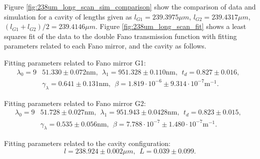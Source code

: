 Figure \ref{fig:238um_long_scan_sim_comparison} show the comparison of data and simulation for a cavity of lengths given as $l_{G1} = 239.3975 \mu m$, $l_{G2} = 239.4317 \mu m$, $(l_{G1} + l_{G2})/2 = 239.4146 \mu m$. Figure \ref{fig:238um_long_scan_fit} shows a least squares fit of the data to the double Fano transmission function with fitting parameters related to each Fano mirror, and the cavity as follows.

Fitting parameters related to Fano mirror G1:
\begin{equation}
    \begin{split}
        \lambda_0 = 9&51.330 \pm 0.072 \text{nm}, \:\: \lambda_1 = 951.328 \pm 0.110 \text{nm}, \:\: t_d = 0.827 \pm 0.016, \:\: \\&\gamma_{\lambda} = 0.641 \pm 0.131 \text{nm}, \:\: \beta = 1.819 \cdot 10^{-6} \pm 9.314 \cdot 10^{-7} \text{m}^{-1}.
    \end{split}
\end{equation}

Fitting parameters related to Fano mirror G2:
\begin{equation}
    \begin{split}
        \lambda_0 = 9&51.728 \pm 0.027 \text{nm}, \:\: \lambda_1 = 951.943 \pm 0.0428 \text{nm}, \:\: t_d = 0.823 \pm 0.015, \:\: \\&\gamma_{\lambda} = 0.535 \pm 0.056 \text{nm}, \:\: \beta = 7.788 \cdot 10^{-7} \pm 1.480 \cdot 10^{-7} \text{m}^{-1}.
    \end{split}
\end{equation}

Fitting parameters related to the cavity configuration:
\begin{equation}
    l = 238.924 \pm 0.002 \mu m, \:\: L = 0.039 \pm 0.099.
\end{equation}

